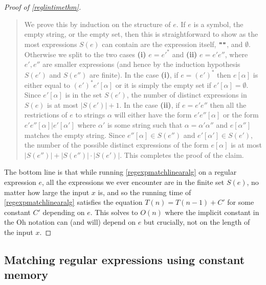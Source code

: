 \begin{proof}[Proof of \cref{reglintimethm}]
\begin{quote}
We prove this by induction on the structure of \(e\). If \(e\) is a
symbol, the empty string, or the empty set, then this is straightforward
to show as the most expressions \(S(e)\) can contain are the expression
itself, \(\ensuremath{\text{\texttt{""}}}\), and \(\emptyset\).
Otherwise we split to the two cases \textbf{(i)} \(e = e'^*\) and
\textbf{(ii)} \(e = e'e''\), where \(e',e''\) are smaller expressions
(and hence by the induction hypothesis \(S(e')\) and \(S(e'')\) are
finite). In the case \textbf{(i)}, if \(e = (e')^*\) then \(e[\alpha]\)
is either equal to \((e')^* e'[\alpha]\) or it is simply the empty set
if \(e'[\alpha]=\emptyset\). Since \(e'[\alpha]\) is in the set
\(S(e')\), the number of distinct expressions in \(S(e)\) is at most
\(|S(e')|+1\). In the case \textbf{(ii)}, if \(e = e' e''\) then all the
restrictions of \(e\) to strings \(\alpha\) will either have the form
\(e' e''[\alpha]\) or the form \(e' e''[\alpha] | e'[\alpha']\) where
\(\alpha'\) is some string such that \(\alpha = \alpha' \alpha''\) and
\(e[\alpha'']\) matches the empty string. Since
\(e''[\alpha] \in S(e'')\) and \(e'[\alpha'] \in S(e')\), the number of
the possible distinct expressions of the form \(e[\alpha]\) is at most
\(|S(e'')| + |S(e'')|\cdot |S(e')|\). This completes the proof of the
claim.

\end{quote}

The bottom line is that while running \cref{regexpmatchlinearalg} on a
regular expression \(e\), all the expressions we ever encounter are in
the finite set \(S(e)\), no matter how large the input \(x\) is, and so
the running time of \cref{regexpmatchlinearalg} satisfies the equation
\(T(n) = T(n-1) + C'\) for some constant \(C'\) depending on \(e\). This
solves to \(O(n)\) where the implicit constant in the Oh notation can
(and will) depend on \(e\) but crucially, not on the length of the input
\(x\).

\end{proof}

\subsection{Matching regular expressions using constant
memory}\label{Matching-regular-expressi}

